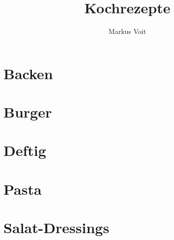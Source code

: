 \documentclass[
  DIV=11,%
  pagesize,%
  fontsize=11pt,%
  paper=a4,%
  numbers=noenddot,
]{scrartcl}
\title{Kochrezepte}
\author{Markus Voit}
\begin{document}
\maketitle

\tableofcontents
\clearpage

\section{Backen}
\newpage{}

\section{Burger}
\newpage{}
\newpage{}

\section{Deftig}
\newpage{}
\newpage{}
\newpage{}
\newpage{}

\section{Pasta}
\newpage{}
\newpage{}

\section{Salat-Dressings}
\newpage{}
\end{document}
